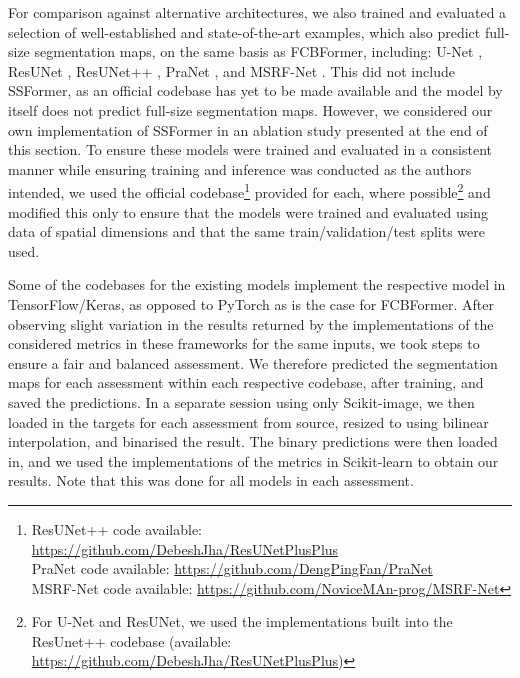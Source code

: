 \documentclass[runningheads]{llncs}
\begin{document}
For comparison against alternative architectures, we also trained and evaluated a selection of well-established and state-of-the-art examples, which also predict full-size segmentation maps, on the same basis as FCBFormer, including: U-Net \cite{unet}, ResUNet \cite{resunet}, ResUNet++ \cite{resunet++}, PraNet \cite{pranet}, and MSRF-Net \cite{msrfnet}. This did not include SSFormer, as an official codebase has yet to be made available and the model by itself does not predict full-size segmentation maps. However, we considered our own implementation of SSFormer in an ablation study presented at the end of this section. To ensure these models were trained and evaluated in a consistent manner while ensuring training and inference was conducted as the authors intended, we used the official codebase\footnote{ResUNet++ code available: \url{https://github.com/DebeshJha/ResUNetPlusPlus}\\
PraNet code available: \url{https://github.com/DengPingFan/PraNet}\\
MSRF-Net code available:  \url{https://github.com/NoviceMAn-prog/MSRF-Net}} provided for each, where possible\footnote{For U-Net and ResUNet, we used the implementations built into the ResUnet++ codebase (available: \url{https://github.com/DebeshJha/ResUNetPlusPlus})} and modified this only to ensure that the models were trained and evaluated using data of  spatial dimensions and that the same train/validation/test splits were used.

Some of the codebases for the existing models implement the respective model in TensorFlow/Keras, as opposed to PyTorch as is the case for FCBFormer. After observing slight variation in the results returned by the implementations of the considered metrics in these frameworks for the same inputs, we took steps to ensure a fair and balanced assessment. We therefore predicted the segmentation maps for each assessment within each respective codebase, after training, and saved the predictions. In a separate session using only Scikit-image, we then loaded in the targets for each assessment from source, resized to  using bilinear interpolation, and binarised the result. The binary predictions were then loaded in, and we used the implementations of the metrics in Scikit-learn to obtain our results. Note that this was done for all models in each assessment.
\end{document}
